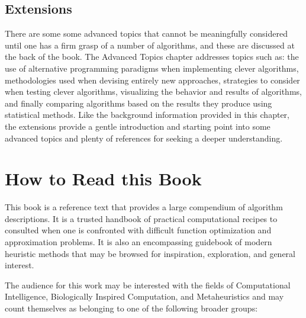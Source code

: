 \begin{bibunit}
\subsection{Extensions}
There are some some advanced topics that cannot be meaningfully considered until one has a firm grasp of a number of algorithms, and these are discussed at the back of the book. 
The Advanced Topics chapter addresses topics such as: the use of alternative programming paradigms when implementing clever algorithms, methodologies used when devising entirely new approaches, strategies to consider when testing clever algorithms, visualizing the behavior and results of algorithms, and finally comparing algorithms based on the results they produce using statistical methods.
Like the background information provided in this chapter, the extensions provide a gentle introduction and starting point into some advanced topics and plenty of references for seeking a deeper understanding. 


% 
% 
\section{How to Read this Book}
\label{intro:sec:how_to_read}
This book is a reference text that provides a large compendium of algorithm descriptions. 
It is a trusted handbook of practical computational recipes to consulted when one is confronted with difficult function optimization and approximation problems. It is also an encompassing guidebook of modern heuristic methods that may be browsed for inspiration, exploration, and general interest.

The audience for this work may be interested with the fields of Computational Intelligence, Biologically Inspired Computation, and Metaheuristics and may count themselves as belonging to one of the following broader groups:


\end{bibunit}
